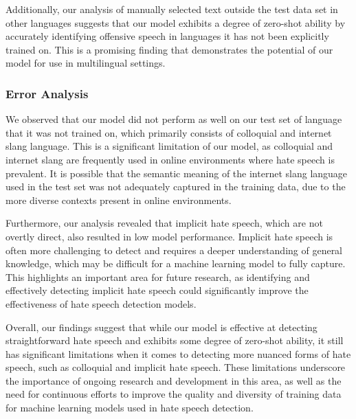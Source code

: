 \documentclass[11pt]{article}
\begin{document}
Additionally, our analysis of manually selected text outside the test data set in other languages suggests that our model exhibits a degree of zero-shot ability by accurately identifying offensive speech in languages it has not been explicitly trained on. This is a promising finding that demonstrates the potential of our model for use in multilingual settings.

\subsubsection{Error Analysis}
We observed that our model did not perform as well on our test set of language that it was not trained on, which primarily consists of colloquial and internet slang language. This is a significant limitation of our model, as colloquial and internet slang are frequently used in online environments where hate speech is prevalent. It is possible that the semantic meaning of the internet slang language used in the test set was not adequately captured in the training data, due to the more diverse contexts present in online environments.

Furthermore, our analysis revealed that implicit hate speech, which are not overtly direct, also resulted in low model performance. Implicit hate speech is often more challenging to detect and requires a deeper understanding of general knowledge, which may be difficult for a machine learning model to fully capture. This highlights an important area for future research, as identifying and effectively detecting implicit hate speech could significantly improve the effectiveness of hate speech detection models.

Overall, our findings suggest that while our model is effective at detecting straightforward hate speech and exhibits some degree of zero-shot ability, it still has significant limitations when it comes to detecting more nuanced forms of hate speech, such as colloquial and implicit hate speech. These limitations underscore the importance of ongoing research and development in this area, as well as the need for continuous efforts to improve the quality and diversity of training data for machine learning models used in hate speech detection.
\end{document}

